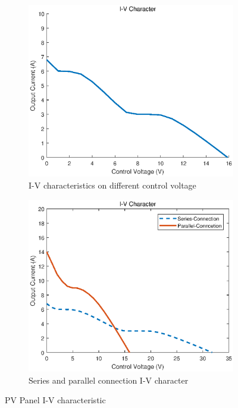 \documentclass[conference]{IEEEtran}
\begin{document}
\begin{figure}
     \centering
     \begin{subfigure}[b]{0.8\linewidth}
         \centering
         \includegraphics[width=\linewidth]{IEEE_CEC_SS/one-panel.eps}
         \caption{I-V characteristics on different control voltage}
         \label{one_panel}
     \end{subfigure}
     \hfill
     \begin{subfigure}[b]{0.8\linewidth}
         \centering
         \includegraphics[width=\linewidth]{IEEE_CEC_SS/ser-par.eps}
         \caption{Series and parallel connection I-V character}
         \label{ser-par}
     \end{subfigure}
        \caption{PV Panel I-V characteristic}
        \label{fig:three graphs}
\end{figure}
\end{document}
